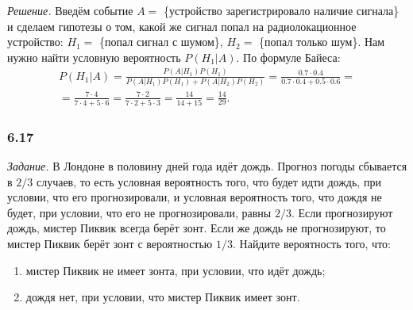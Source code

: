 \textit{Решение.}
Введём событие $A =$ \{устройство зарегистрировало наличие сигнала\} и сделаем гипотезы о том,
какой же сигнал попал на радиолокационное устройство: $H_1 =$ \{попал сигнал с шумом\}, $H_2 =$ \{попал только шум\}.
Нам нужно найти условную вероятность $P \left( \left. H_1 \right| A \right) $.
По формуле Байеса:
\begin{equation*}
\begin{split}
P \left( \left. H_1 \right| A \right) =
\frac{P \left( \left. A \right| H_1 \right) P \left( H_1 \right) }{P \left( \left. A \right| H_1 \right) P \left( H_1 \right) +
P \left( \left. A \right| H_2 \right) P \left( H_2 \right) } =
\frac{0.7 \cdot 0.4}{0.7 \cdot 0.4 + 0.5 \cdot 0.6} = \\
= \frac{7 \cdot 4}{7 \cdot 4 + 5 \cdot 6} =
\frac{7 \cdot 2}{7 \cdot 2 + 5 \cdot 3} =
\frac{14}{14 + 15} =
\frac{14}{29}.
\end{split}
\end{equation*}

\subsubsection*{6.17}

\textit{Задание.} В Лондоне в половину дней года идёт дождь.
Прогноз погоды сбывается в $2/3$ случаев,
то есть условная вероятность того,
что будет идти дождь, при условии, что его прогнозировали, и условная вероятность того, что дождя не будет, при условии, что его не прогнозировали, равны $2/3$.
Если прогнозируют дождь, мистер Пиквик всегда берёт зонт.
Если же дождь не прогнозируют, то мистер Пиквик берёт зонт с вероятностью $1/3$.
Найдите вероятность того, что:
\begin{enumerate}[label=\alph*)]
\item мистер Пиквик не имеет зонта, при условии, что идёт дождь;
\item дождя нет, при условии, что мистер Пиквик имеет зонт.
\end{enumerate}


